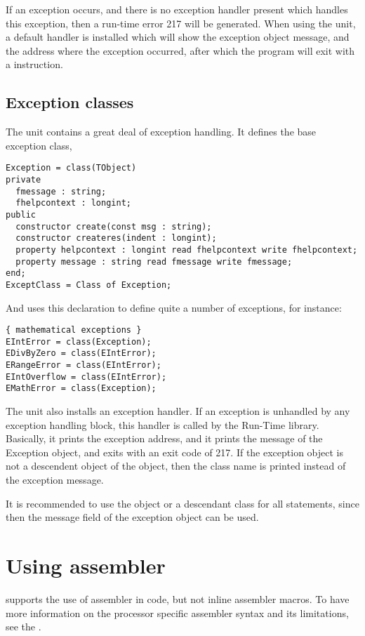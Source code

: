 If an exception occurs, and there is no exception handler present which
handles this exception, then a run-time error 217 will be generated. 
When using the  unit, a default handler is installed which will show the exception object message, and the
address where the exception occurred, after which the program will exit with
a  instruction. 


\section{Exception classes}
\label{se:exceptclasses}
The  unit contains a great deal of exception handling.
It defines the base exception class, 
\begin{verbatim}
Exception = class(TObject)
private
  fmessage : string;
  fhelpcontext : longint;
public
  constructor create(const msg : string);
  constructor createres(indent : longint);
  property helpcontext : longint read fhelpcontext write fhelpcontext;
  property message : string read fmessage write fmessage;
end;
ExceptClass = Class of Exception;
\end{verbatim}
And uses this declaration to define quite a number of exceptions, for
instance:
\begin{verbatim}
{ mathematical exceptions }
EIntError = class(Exception);
EDivByZero = class(EIntError);
ERangeError = class(EIntError);
EIntOverflow = class(EIntError);
EMathError = class(Exception);
\end{verbatim}
The  unit also installs an exception handler. If an exception is
unhandled by any exception handling block, this handler is called by the
Run-Time library. Basically, it prints the exception address, and it prints
the message of the Exception object, and exits with an exit code of 217.
If the exception object is not a descendent object of the 
object, then the class name is printed instead of the exception message.

It is recommended to use the  object or a descendant class
for all  statements, since then the message
field of the exception object can be used.

\chapter{Using assembler}
\fpc supports the use of assembler in code, but not inline
assembler macros.  To have more information on the processor
specific assembler syntax and its limitations, see the \progref.

